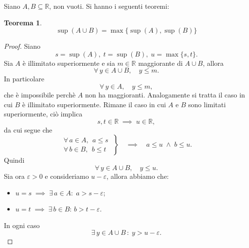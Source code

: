 \documentclass{article}
\theoremstyle{plain}
\newtheorem{thm}{Teorema}[section]
\theoremstyle{definition}
\theoremstyle{remark}
\begin{document}
\vspace{10pt}

Siano $A,B\subseteq\mathbb{R}$, non vuoti. Si hanno i seguenti teoremi:

\vspace{10pt}

\begin{bxthm}
\begin{thm}
    \[\sup(A\cup B)=\max\{\sup(A),\sup(B)\}\]
\end{thm}
\end{bxthm}
\begin{proof}
    Siano 
    \[s=\sup(A),\;t=\sup(B),\;u=\max\{s,t\}.\]
    Sia $A$ è illimitato superiormente e sia $m\in\mathbb{R}$ maggiorante di $A\cup B$, 
    allora \[\forall\, y\in A\cup B,\quad y\leq m.\]
    In particolare 
    \[\forall\, y\in A,\quad y\leq m,\] 
    che è impossibile perchè $A$ non ha maggioranti.
    Analogamente si tratta il caso in cui $B$ è illimitato superiormente.
    Rimane il caso in cui $A$ e $B$ sono limitati superiormente, ciò implica
    \[
        s,t\in\mathbb{R}\;\implies\; u\in\mathbb{R},
    \]
    da cui segue che
    \[\left.\begin{array}{l}
        \forall\,a\in A,\;\,a\leq s\;\\
        \forall\,b\in B,\;\,b\leq t
    \end{array}\right\}\quad\implies\quad a\leq u\;\land\;b\leq u.\]
    Quindi 
    \[\forall\,y\in A\cup B,\quad y\leq u.\]
    Sia ora $\varepsilon>0$ e consideriamo $u-\varepsilon$, allora abbiamo che: 
    \begin{itemize}
        \item $u=s\; \implies\; \exists\, a\in A:\; a>s-\varepsilon$;
        \item $u=t\; \implies\; \exists\, b\in B:\, b>t-\varepsilon$.
   \end{itemize}
    In ogni caso 
    \[\exists\, y\in A\cup B\,:\;y>u-\varepsilon.\]
\end{proof}

\vspace{10pt}
\end{document}
